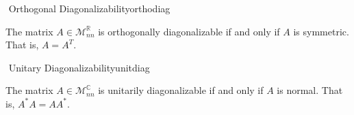         \pagebreak
        \begin{theorem}{\Stop\,\,Orthogonal Diagonalizability}{orthodiag}

            The matrix \(A\in\mathcal{M}_{nn}^\mathbb{R}\) is orthogonally diagonalizable if and only if \(A\) is symmetric. That is, \(A=A^T\).

        \end{theorem}
        \begin{theorem}{\Stop\,\,Unitary Diagonalizability}{unitdiag}

            The matrix \(A\in\mathcal{M}_{nn}^\mathbb{C}\) is unitarily diagonalizable if and only if \(A\) is normal. That is, \(A^*A=AA^*\).

        \end{theorem}